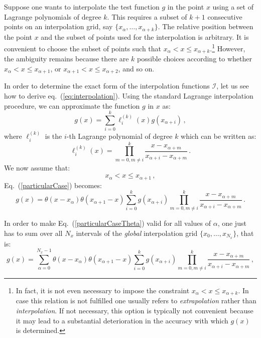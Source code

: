 \documentclass[10pt,a4paper]{article}
\begin{document}
Suppose one wants to interpolate the test function $g$ in the point
$x$ using a set of Lagrange polynomials of degree $k$. This requires a
subset of $k+1$ consecutive points on an interpolation grid, say
$\{x_{\alpha},\dots,x_{\alpha+k}\}$. The relative position between the
point $x$ and the subset of points used for the interpolation is
arbitrary. It is convenient to choose the subset of points such that
$x_\alpha < x \leq x_{\alpha+k}$.\footnote{In fact, it is not even
  necessary to impose the constraint $x_\alpha < x \leq x_{\alpha+k}$.
  In case this relation is not fulfilled one usually refers to
  \textit{extrapolation} rather than \textit{interpolation}. If not
  necessary, this option is typically not convenient because it may
  lead to a substantial deterioration in the accuracy with which
  $g(x)$ is determined.}  However, the ambiguity remains because there
are $k$ possible choices according to whether
$x_\alpha < x \leq x_{\alpha+1}$, or
$x_{\alpha+1} < x \leq x_{\alpha+2}$, and so on.

In order to determine the exact form of the interpolation functions
$\mathcal{I}$, let us see how to derive
eq.~(\ref{eq:interpolation}). Using the standard Lagrange
interpolation procedure, we can approximate the function $g$ in $x$
as:
\begin{equation}\label{particularCase}
g(x) = \sum_{i=0}^k\ell_i^{(k)}(x)g(x_{\alpha+i})\,,
\end{equation}
where $\ell_i^{(k)}$ is the $i$-th Lagrange polynomial of degree $k$
which can be written as:
\begin{equation}\label{eq:LagPoly}
\ell_i^{(k)}(x) = \prod^{k}_{m=0,m\ne
i}\frac{x-x_{\alpha+m}}{x_{\alpha+i}-x_{\alpha+m}}\,.
\end{equation}
We now assume that:
\begin{equation}\label{eq:assumption1}
x_{\alpha} < x \leq x_{\alpha+1}\,,
\end{equation}
Eq.~(\ref{particularCase}) becomes:
\begin{equation}\label{particularCaseTheta}
  g(x) =
  \theta(x-x_{\alpha})\theta(x_{\alpha+1}-x)\sum_{i=0}^k
  g(x_{\alpha+i})\prod^{k}_{m=0,m\ne
    i}\frac{x-x_{\alpha+m}}{x_{\alpha+i}-x_{\alpha+m}}\,.
\end{equation}

In order to make Eq.~(\ref{particularCaseTheta}) valid for all values
of $\alpha$, one just has to sum over all $N_x$ intervals of the
\textit{global} interpolation grid $\{x_0,\dots,x_{N_x}\}$, that is:
\begin{equation}\label{generalCase}
  g(x) =
  \sum_{\alpha=0}^{N_x-1}\theta(x-x_{\alpha})\theta(x_{\alpha+1}-x)\sum_{i=0}^k
  g(x_{\alpha+i})\prod^{k}_{m=0,m\ne
    i}\frac{x-x_{\alpha+m}}{x_{\alpha+i}-x_{\alpha+m}}\,,
\end{equation}
\end{document}
